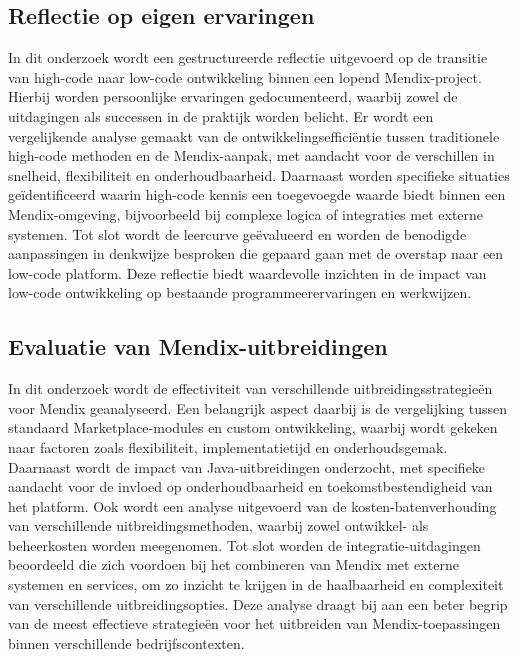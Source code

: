 \subsection{Reflectie op eigen ervaringen}
In dit onderzoek wordt een gestructureerde reflectie uitgevoerd op de transitie van high-code naar low-code ontwikkeling binnen een lopend Mendix-project. Hierbij worden persoonlijke ervaringen gedocumenteerd, waarbij zowel de uitdagingen als successen in de praktijk worden belicht. Er wordt een vergelijkende analyse gemaakt van de ontwikkelingsefficiëntie tussen traditionele high-code methoden en de Mendix-aanpak, met aandacht voor de verschillen in snelheid, flexibiliteit en onderhoudbaarheid. Daarnaast worden specifieke situaties geïdentificeerd waarin high-code kennis een toegevoegde waarde biedt binnen een Mendix-omgeving, bijvoorbeeld bij complexe logica of integraties met externe systemen. Tot slot wordt de leercurve geëvalueerd en worden de benodigde aanpassingen in denkwijze besproken die gepaard gaan met de overstap naar een low-code platform. Deze reflectie biedt waardevolle inzichten in de impact van low-code ontwikkeling op bestaande programmeerervaringen en werkwijzen.

\subsection{Evaluatie van Mendix-uitbreidingen}
In dit onderzoek wordt de effectiviteit van verschillende uitbreidingsstrategieën voor Mendix geanalyseerd. Een belangrijk aspect daarbij is de vergelijking tussen standaard Marketplace-modules en custom ontwikkeling, waarbij wordt gekeken naar factoren zoals flexibiliteit, implementatietijd en onderhoudsgemak. Daarnaast wordt de impact van Java-uitbreidingen onderzocht, met specifieke aandacht voor de invloed op onderhoudbaarheid en toekomstbestendigheid van het platform. Ook wordt een analyse uitgevoerd van de kosten-batenverhouding van verschillende uitbreidingsmethoden, waarbij zowel ontwikkel- als beheerkosten worden meegenomen. Tot slot worden de integratie-uitdagingen beoordeeld die zich voordoen bij het combineren van Mendix met externe systemen en services, om zo inzicht te krijgen in de haalbaarheid en complexiteit van verschillende uitbreidingsopties. Deze analyse draagt bij aan een beter begrip van de meest effectieve strategieën voor het uitbreiden van Mendix-toepassingen binnen verschillende bedrijfscontexten.

